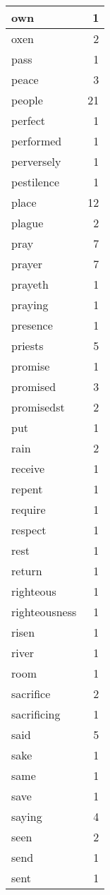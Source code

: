 \begin{center}
\begin{longtable}{l|r}
own & 1 \\ \hline
oxen & 2 \\ \hline
pass & 1 \\ \hline
peace & 3 \\ \hline
people & 21 \\ \hline
perfect & 1 \\ \hline
performed & 1 \\ \hline
perversely & 1 \\ \hline
pestilence & 1 \\ \hline
place & 12 \\ \hline
plague & 2 \\ \hline
pray & 7 \\ \hline
prayer & 7 \\ \hline
prayeth & 1 \\ \hline
praying & 1 \\ \hline
presence & 1 \\ \hline
priests & 5 \\ \hline
promise & 1 \\ \hline
promised & 3 \\ \hline
promisedst & 2 \\ \hline
put & 1 \\ \hline
rain & 2 \\ \hline
receive & 1 \\ \hline
repent & 1 \\ \hline
require & 1 \\ \hline
respect & 1 \\ \hline
rest & 1 \\ \hline
return & 1 \\ \hline
righteous & 1 \\ \hline
righteousness & 1 \\ \hline
risen & 1 \\ \hline
river & 1 \\ \hline
room & 1 \\ \hline
sacrifice & 2 \\ \hline
sacrificing & 1 \\ \hline
said & 5 \\ \hline
sake & 1 \\ \hline
same & 1 \\ \hline
save & 1 \\ \hline
saying & 4 \\ \hline
seen & 2 \\ \hline
send & 1 \\ \hline
sent & 1 \\ \hline

\end{longtable}
\end{center}
